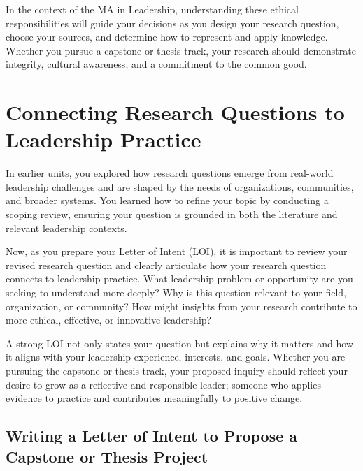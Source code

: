 \documentclass[
  letterpaper,
  DIV=11,
  numbers=noendperiod]{scrreprt}
\begin{document}
In the context of the MA in Leadership, understanding these ethical
responsibilities will guide your decisions as you design your research
question, choose your sources, and determine how to represent and apply
knowledge. Whether you pursue a capstone or thesis track, your research
should demonstrate integrity, cultural awareness, and a commitment to
the common good.


\chapter*{Connecting Research Questions to Leadership
Practice}\label{connecting-research-questions-to-leadership-practice}


In earlier units, you explored how research questions emerge from
real-world leadership challenges and are shaped by the needs of
organizations, communities, and broader systems. You learned how to
refine your topic by conducting a scoping review, ensuring your question
is grounded in both the literature and relevant leadership contexts.

Now, as you prepare your Letter of Intent (LOI), it is important to
review your revised research question and clearly articulate how your
research question connects to leadership practice. What leadership
problem or opportunity are you seeking to understand more deeply? Why is
this question relevant to your field, organization, or community? How
might insights from your research contribute to more ethical, effective,
or innovative leadership?

A strong LOI not only states your question but explains why it matters
and how it aligns with your leadership experience, interests, and goals.
Whether you are pursuing the capstone or thesis track, your proposed
inquiry should reflect your desire to grow as a reflective and
responsible leader; someone who applies evidence to practice and
contributes meaningfully to positive change.

\section*{Writing a Letter of Intent to Propose a Capstone or Thesis
Project}\label{writing-a-letter-of-intent-to-propose-a-capstone-or-thesis-project}
\end{document}
